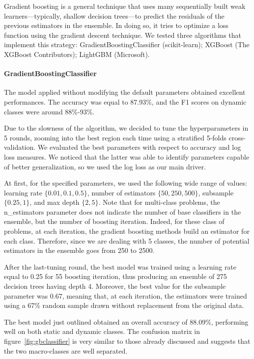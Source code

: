 \documentclass[10pt, a4paper, twocolumn]{article}
\begin{document}
Gradient boosting is a general technique that uses many sequentially built weak learners---typically,  shallow decision trees---to predict the residuals of the previous estimators in the ensemble. In doing so, it tries to optimize a loss function using the gradient descent technique. We tested three algorithms that implement this strategy: GradientBoostingClassifier (scikit-learn); XGBoost (The XGBoost Contributors); LightGBM (Microsoft).

\paragraph{GradientBoostingClassifier} The model applied without modifying the default parameters obtained excellent performances. The accuracy was equal to 87.93\%, and the F1 scores on dynamic classes were around 88\%-93\%.

Due to the slowness of the algorithm, we decided to tune the hyperparameters in 5 rounds, zooming into the best region each time using a stratified 5-folds cross-validation. We evaluated the best parameters with respect to accuracy and log loss measures. We noticed that the latter was able to identify parameters capable of better generalization, so we used the log loss as our main driver.

At first, for the specified parameters, we used the following wide range of values: learning rate $\{0.01, 0.1, 0.5\}$, number of estimators $\{50, 250, 500\}$, subsample $\{0.25, 1\}$, and max depth $\{2, 5\}$. Note that for multi-class problems, the n\_estimators parameter does not indicate the number of base classifiers in the ensemble, but the number of boosting iteration. Indeed, for these class of problems, at each iteration, the gradient boosting methods build an estimator for each class. Therefore, since we are dealing with 5 classes, the number of potential estimators in the ensemble goes from 250 to 2500. 

After the last-tuning round, the best model was trained using a learning rate equal to 0.25 for 55 boosting iteration, thus producing an ensemble of 275 decision trees having depth 4. Moreover, the best value for the subsample parameter was 0.67, meaning that, at each iteration, the estimators were trained using a 67\% random sample drawn without replacement from the original data.

The best model just outlined obtained an overall accuracy of 88.09\%, performing well on both static and dynamic classes. The confusion matrix in figure~\ref{fig:gbclassifier} is very similar to those already discussed and suggests that the two macro-classes are well separated.  
\end{document}
